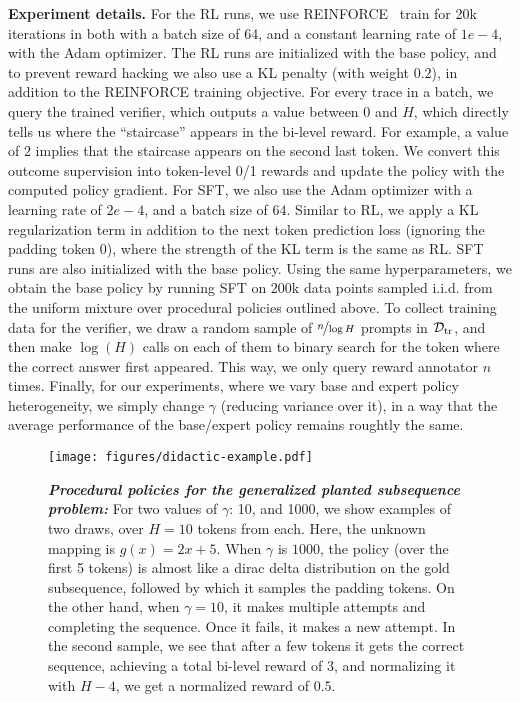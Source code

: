 \textbf{Experiment details.} For the RL runs, we use REINFORCE~\cite{ahmadian2024back} train for 20k iterations in both with a batch size of 64, and a constant learning rate of $1e-4$, with the Adam optimizer. The RL runs are initialized with the base policy, and to prevent reward hacking we also use a KL penalty (with weight $0.2$), in addition to the REINFORCE training objective. 
For every trace in a batch, we query the trained verifier, which outputs a value between $0$ and $H$, which directly tells us where the ``staircase'' appears in the bi-level reward. For example, a value of $2$ implies that the staircase appears on the second last token. We convert this outcome supervision into token-level 0/1 rewards and update the policy with the computed policy gradient. For SFT, we also use the Adam optimizer with a learning rate of $2e-4$, and a batch size of $64$. Similar to RL, we apply a KL regularization term in addition to the next token prediction loss (ignoring the padding token 0), where the strength of the KL term is the same as RL. SFT runs are also initialized with the base policy. Using the same hyperparameters, we obtain the base policy by running SFT on 200k data points sampled i.i.d. from  the uniform mixture over procedural policies outlined above. To collect training data for the verifier, we draw a random sample of $\nicefrac{n}{\log H}$ prompts in ${\mathcal{D}}_\mathrm{tr}$, and then make $\log(H)$ calls on each of them to binary search for the token where the correct answer first appeared. This way, we only query reward annotator $n$ times. Finally, for our experiments, where we vary base and expert policy heterogeneity, we simply change $\gamma$ (reducing variance over it), in a way that the average performance of the base/expert policy remains roughtly the same. 


\begin{figure}
    \centering
    \texttt{[image: figures/didactic-example.pdf]}
    \caption{\textbf{\emph{Procedural policies for the generalized planted subsequence problem:}} For two values of $\gamma$: 10, and 1000, we show examples of two draws, over $H=10$ tokens from each. Here, the unknown mapping is $g(x)=2x+5$. When $\gamma$ is $1000$, the policy (over the first 5 tokens) is almost like a dirac delta distribution on the gold subsequence, followed by which it samples the padding tokens. On the other hand, when $\gamma=10$, it makes multiple attempts and completing the sequence. Once it fails, it makes a new attempt. In the second sample, we see that after a few tokens it gets the correct sequence, achieving a total bi-level reward of $3$, and normalizing it with $H-4$, we get a normalized reward of $0.5$.}
    \label{fig:examples-didactic}
\end{figure}

